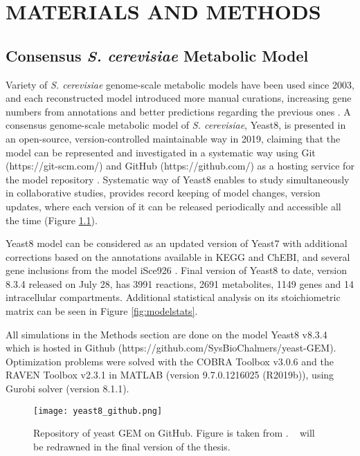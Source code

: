 \chapter{MATERIALS AND METHODS}

\section{Consensus \emph{S. cerevisiae} Metabolic Model}
Variety of \emph{S. cerevisiae} genome-scale metabolic models have been used since 2003, and each reconstructed model introduced more manual curations, increasing gene numbers from annotations and better predictions regarding the previous ones \cite{lopes2017genome}. A consensus genome-scale metabolic model of \emph{S. cerevisiae}, Yeast8, is presented in an open-source, version-controlled maintainable way in 2019, claiming that the model can be represented and investigated in a systematic way using Git (https://git-scm.com/) and GitHub (https://github.com/) as a hosting service for the model repository \cite{lu2019consensus}. Systematic way of Yeast8 enables to study simultaneously in collaborative studies, provides record keeping of model changes, version updates, where each version of it can be released periodically and accessible all the time (Figure \ref{fig:yeast8_github}).

Yeast8 model can be considered as an updated version of Yeast7 \cite{aung2013revising} with additional corrections based on the annotations available in KEGG and ChEBI, and several gene inclusions from the model iSce926 \cite{chowdhury2015using}. Final version of Yeast8 to date, version 8.3.4 released on July 28, has 3991 reactions, 2691 metabolites, 1149 genes and 14 intracellular compartments. Additional statistical analysis on its stoichiometric matrix can be seen in Figure \ref{fig:modelstats}.

All simulations in the Methods section are done on the model Yeast8 v8.3.4 which is hosted in Github (https://github.com/SysBioChalmers/yeast-GEM). Optimization problems were solved with the COBRA Toolbox v3.0.6 and the RAVEN Toolbox v2.3.1 in MATLAB (version 9.7.0.1216025 (R2019b)), using Gurobi solver (version 8.1.1).

\begin{figure}[H]
\begin{center}
\texttt{[image: yeast8\_github.png]}
\end{center}
\caption[Repository of yeast GEM on GitHub]{Repository of yeast GEM on GitHub. Figure is taken from \cite{lu2019consensus}. ~ will be redrawned in the final version of the thesis.}
\label{fig:yeast8_github}
\end{figure}

